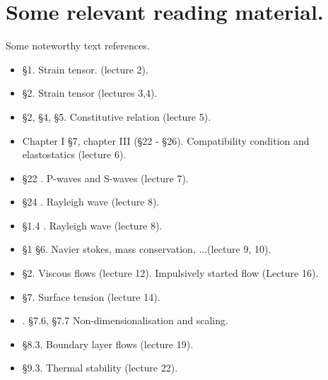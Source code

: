 \chapter{Some relevant reading material.}

Some noteworthy text references.

\begin{itemize}
\item \cite{landau1960theory} \S 1.  Strain tensor. (lecture 2).
\item \cite{landau1960theory} \S 2.  Strain tensor (lectures 3,4).
\item \cite{landau1960theory} \S 2, \S 4, \S 5.  Constitutive relation (lecture 5).
\item \cite{landau1960theory} Chapter I \S 7, chapter III (\S 22 - \S 26).  Compatibility condition and elastostatics (lecture 6).
\item \cite{landau1960theory} \S 22 .  P-waves and S-waves (lecture 7).
\item \cite{landau1960theory} \S 24 .  Rayleigh wave (lecture 8).
\item \cite{acheson1990elementary} \S 1.4 .  Rayleigh wave (lecture 8).
\item \cite{acheson1990elementary} \S 1 \S 6.  Navier stokes, mass conservation, ...(lecture 9, 10).
\item \cite{acheson1990elementary} \S 2.  Viscous flows (lecture 12).  Impulsively started flow (Lecture 16).
\item \cite{landau1987course} \S 7.  Surface tension (lecture 14).
\item \cite{granger1995fluid}.  \S 7.6, \S 7.7 Non-dimensionalisation and scaling.
\item \cite{acheson1990elementary} \S 8.3.  Boundary layer flows (lecture 19).
\item \cite{acheson1990elementary} \S 9.3.  Thermal stability (lecture 22).
\end{itemize}

